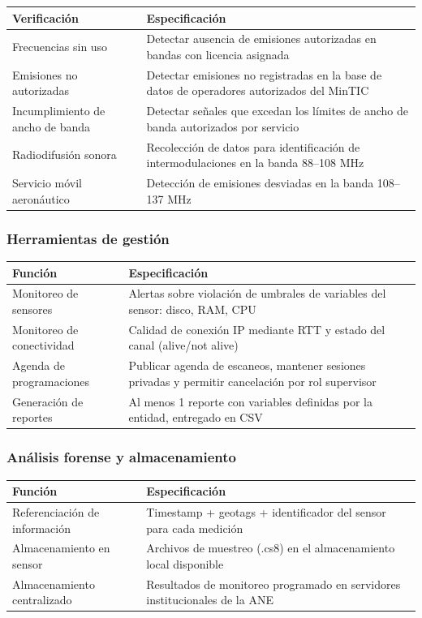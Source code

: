 \begin{tabularx}{\textwidth}{@{}l X@{}}
\toprule
Verificación & Especificación \\
\midrule
Frecuencias sin uso & Detectar ausencia de emisiones autorizadas en bandas con licencia asignada \\
Emisiones no autorizadas & Detectar emisiones no registradas en la base de datos de operadores autorizados del MinTIC \\
Incumplimiento de ancho de banda & Detectar señales que excedan los límites de ancho de banda autorizados por servicio \\
Radiodifusión sonora & Recolección de datos para identificación de intermodulaciones en la banda 88--108 MHz \\
Servicio móvil aeronáutico & Detección de emisiones desviadas en la banda 108--137 MHz \\
\bottomrule
\end{tabularx}

\subsubsection{Herramientas de gestión}

\begin{tabularx}{\textwidth}{@{}l X@{}}
\toprule
Función & Especificación \\
\midrule
Monitoreo de sensores & Alertas sobre violación de umbrales de variables del sensor: disco, RAM, CPU \\
Monitoreo de conectividad & Calidad de conexión IP mediante RTT y estado del canal (alive/not alive) \\
Agenda de programaciones & Publicar agenda de escaneos, mantener sesiones privadas y permitir cancelación por rol supervisor \\
Generación de reportes & Al menos 1 reporte con variables definidas por la entidad, entregado en CSV \\
\bottomrule
\end{tabularx}

\subsubsection{Análisis forense y almacenamiento}

\begin{tabularx}{\textwidth}{@{}l X@{}}
\toprule
Función & Especificación \\
\midrule
Referenciación de información & Timestamp + geotags + identificador del sensor para cada medición \\
Almacenamiento en sensor & Archivos de muestreo (.cs8) en el almacenamiento local disponible \\
Almacenamiento centralizado & Resultados de monitoreo programado en servidores institucionales de la ANE \\
\bottomrule
\end{tabularx}

